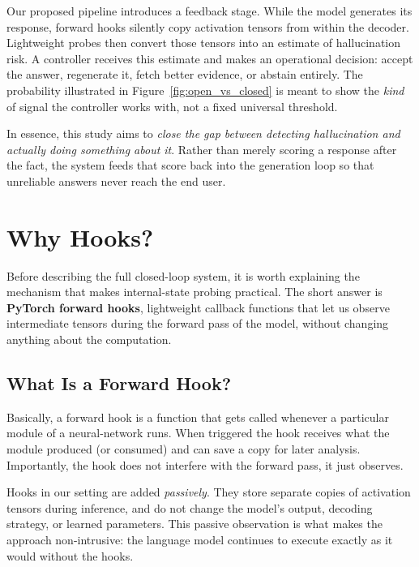 Our proposed pipeline introduces a feedback stage. While the model generates its response, forward hooks silently copy activation tensors from within the decoder. Lightweight probes then convert those tensors into an estimate of hallucination risk. A controller receives this estimate and makes an operational decision: accept the answer, regenerate it, fetch better evidence, or abstain entirely. The probability illustrated in Figure~\ref{fig:open_vs_closed} is meant to show the \emph{kind} of signal the controller works with, not a fixed universal threshold.

In essence, this study aims to \emph{close the gap between detecting hallucination and actually doing something about it}. Rather than merely scoring a response after the fact, the system feeds that score back into the generation loop so that unreliable answers never reach the end user.

\section{Why Hooks?}
\label{sec:why_hooks}

Before describing the full closed-loop system, it is worth explaining the mechanism that makes internal-state probing practical. The short answer is \textbf{PyTorch forward hooks}, lightweight callback functions that let us observe intermediate tensors during the forward pass of the model, without changing anything about the computation.

\subsection{What Is a Forward Hook?}
\label{subsec:forward_hook}

Basically, a forward hook is a function that gets called whenever a particular module of a neural-network runs. When triggered the hook receives what the module produced (or consumed) and can save a copy for later analysis. Importantly, the hook does not interfere with the forward pass, it just observes.

Hooks in our setting are added \emph{passively}. They store separate copies of activation tensors during inference, and do not change the model’s output, decoding strategy, or learned parameters. This passive observation is what makes the approach non-intrusive: the language model continues to execute exactly as it would without the hooks.

